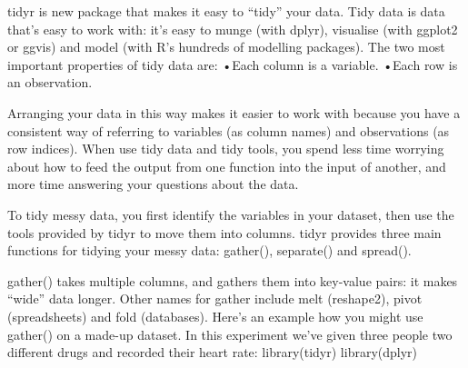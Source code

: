 tidyr is new package that makes it easy to “tidy” your data. Tidy data is data that’s easy to work with: it’s easy to munge (with dplyr), visualise (with ggplot2 or ggvis) and model (with R’s hundreds of modelling packages). The two most important properties of tidy data are:
 •Each column is a variable.
 •Each row is an observation.
 
Arranging your data in this way makes it easier to work with because you have a consistent way of referring to variables (as column names) and observations (as row indices). When use tidy data and tidy tools, you spend less time worrying about how to feed the output from one function into the input of another, and more time answering your questions about the data.
 
To tidy messy data, you first identify the variables in your dataset, then use the tools provided by tidyr to move them into columns. tidyr provides three main functions for tidying your messy data: gather(), separate() and spread().
 
gather() takes multiple columns, and gathers them into key-value pairs: it makes “wide” data longer. Other names for gather include melt (reshape2), pivot (spreadsheets) and fold (databases). Here’s an example how you might use gather() on a made-up dataset. In this experiment we’ve given three people two different drugs and recorded their heart rate:
 library(tidyr)
library(dplyr)

